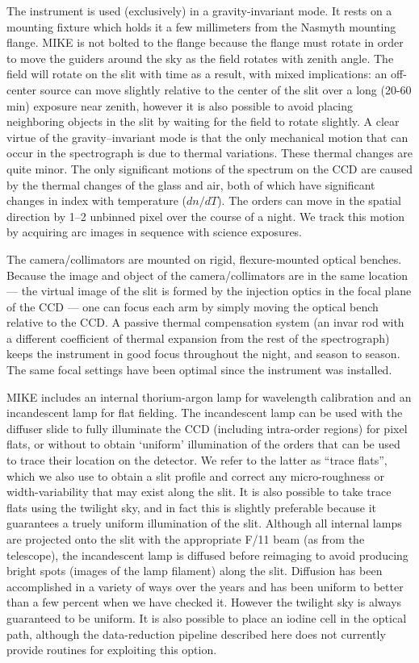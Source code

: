 \documentclass[12pt,preprint]{aastex}
\begin{document}
The instrument is used (exclusively) in a gravity-invariant mode.  It
rests on a mounting fixture which holds it a few millimeters from the
Nasmyth mounting flange.  MIKE is not bolted to the flange because the
flange must rotate in order to move the guiders around the sky as the
field rotates with zenith angle. The field will rotate on the slit
with time as a result, with mixed implications: an off-center source
can move slightly relative to the center of the slit over a long
(20-60 min) exposure near zenith, however it is also possible to avoid
placing neighboring objects in the slit by waiting for the field to
rotate slightly.  A clear virtue of the gravity--invariant mode is
that the only mechanical motion that can occur in the spectrograph is
due to thermal variations. These thermal changes are quite minor.
The only significant motions of the spectrum on the CCD are caused by
the thermal changes of the glass and air, both of which have
significant changes in index with temperature ($dn/dT$).  The orders can
move in the spatial direction by 1--2 unbinned pixel over the course
of a night.  We track this motion by acquiring arc images in
sequence with science exposures.

The camera/collimators are mounted on rigid, flexure-mounted optical
benches.  Because the image and object of the camera/collimators are
in the same location --- the virtual image of the slit is formed by
the injection optics in the focal plane of the CCD --- one can focus
each arm by simply moving the optical bench relative to the CCD.  A
passive thermal compensation system (an invar rod with a different
coefficient of thermal expansion from the rest of the spectrograph)
keeps the instrument in good focus throughout the night, and season to
season. The same focal settings have been optimal since the
instrument was installed.

MIKE includes an internal thorium-argon lamp for wavelength
calibration and an incandescent lamp for flat fielding.  The
incandescent lamp can be used with the diffuser slide to fully
illuminate the CCD (including intra-order regions) for pixel flats, or
without to obtain `uniform' illumination of the orders that can be
used to trace their location on the detector.  We refer to the latter
as ``trace flats'', which we also use to obtain a slit profile and correct
any micro-roughness or width-variability that may exist along the
slit.  It is also possible to take trace flats using the twilight sky,
and in fact this is slightly preferable because it guarantees a truely
uniform illumination of the slit.  Although all internal lamps are
projected onto the slit with the appropriate F/11 beam (as from the
telescope), the incandescent lamp is diffused before reimaging to
avoid producing bright spots (images of the lamp filament) along the
slit.  Diffusion has been accomplished in a variety of ways over the
years and has been uniform to better than a few percent when we have
checked it.  However the twilight sky is always guaranteed to be
uniform.
It is also possible to place an iodine cell in the optical path, although
the data-reduction pipeline described here does not currently
provide routines for exploiting this option.
\end{document}
